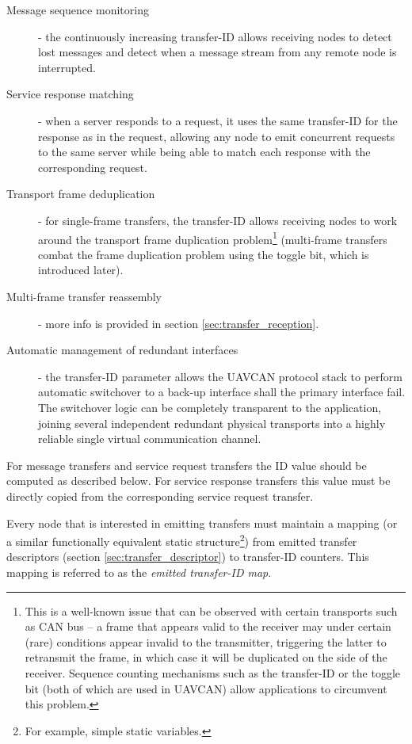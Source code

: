 \begin{description}
    \item[Message sequence monitoring] - the continuously increasing transfer-ID allows receiving nodes to
    detect lost messages and detect when a message stream from any remote node is interrupted.

    \item[Service response matching] - when a server responds to a request, it uses the same transfer-ID for the
    response as in the request,
    allowing any node to emit concurrent requests to the same server while being able to
    match each response with the corresponding request.

    \item[Transport frame deduplication] - for single-frame transfers,
    the transfer-ID allows receiving nodes to work around the transport
    frame duplication problem\footnote{This is a well-known issue that can be observed with certain
    transports such as CAN bus -- a frame that appears valid to the receiver may under certain
    (rare) conditions appear invalid to the transmitter, triggering the latter to retransmit the frame,
    in which case it will be duplicated on the side of the receiver.
    Sequence counting mechanisms such as the transfer-ID or the toggle bit (both of which are used in UAVCAN)
    allow applications to circumvent this problem.} (multi-frame transfers combat the frame duplication
    problem using the toggle bit, which is introduced later).

    \item[Multi-frame transfer reassembly] - more info is provided in section \ref{sec:transfer_reception}.

    \item[Automatic management of redundant interfaces] - the transfer-ID parameter allows the UAVCAN protocol
    stack to perform automatic switchover to a back-up interface shall the primary interface fail.
    The switchover logic can be completely transparent to the application, joining several independent
    redundant physical transports into a highly reliable single virtual communication channel.
\end{description}

For message transfers and service request transfers the ID value should be computed as described below.
For service response transfers this value must be directly copied from the corresponding service request transfer.

Every node that is interested in emitting transfers must maintain a mapping
(or a similar functionally equivalent static structure\footnote{For example, simple static variables.})
from emitted transfer descriptors (section \ref{sec:transfer_descriptor}) to transfer-ID counters.
This mapping is referred to as the \emph{emitted transfer-ID map}.

